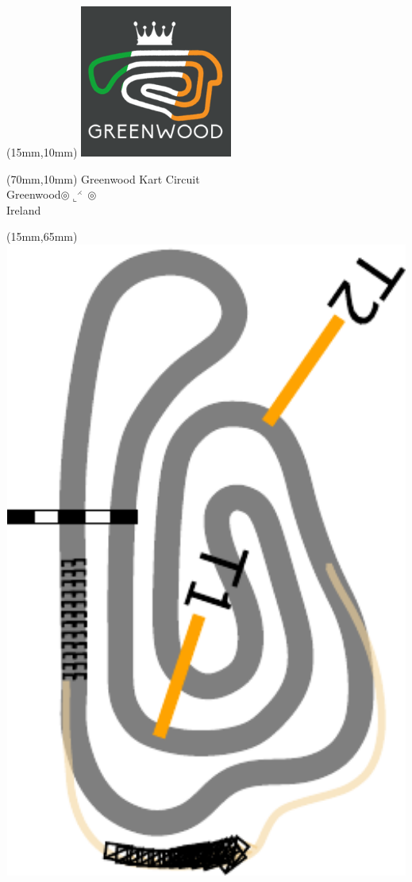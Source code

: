 \null\newpage
\begin{textblock*}{50mm}(15mm,10mm)%
\includegraphics[width=50mm]{LG/GRWO.png}
\end{textblock*}
\begin{textblock*}{130mm}(70mm,10mm)%
{\fontsize{20}{20}\selectfont Greenwood Kart Circuit\\}
{\fontsize{16}{16}\selectfont Greenwood\hfill $\circledcirc\llcorner^{\rightthreetimes}\circledcirc$\\}
{\fontsize{12}{12}\selectfont Ireland\\}
\end{textblock*}
\begin{textblock*}{185mm}(15mm,65mm)%
\centering
\mbox{\includegraphics[width=185mm,height=210mm,keepaspectratio]{PT/GRWOK.pdf}}
\end{textblock*}
